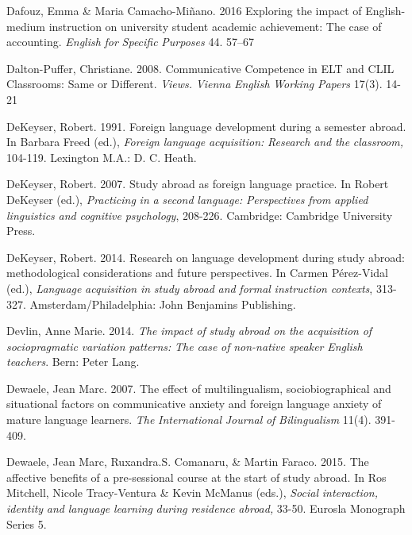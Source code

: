Dafouz, Emma \& Maria Camacho-Miñano. 2016 Exploring the impact of English-medium instruction on university student academic achievement: The case of accounting. \textit{English} \textit{for} \textit{Specific} \textit{Purposes} 44. 57–67

Dalton-Puffer, Christiane. 2008. Communicative Competence in ELT and CLIL Classrooms: Same or Different. \textit{Views.} \textit{Vienna} \textit{English} \textit{Working} \textit{Papers} 17(3). 14-21

DeKeyser, Robert. 1991. Foreign language development during a semester abroad. In Barbara Freed (ed.), \textit{Foreign} \textit{language} \textit{acquisition:} \textit{Research} \textit{and} \textit{the} \textit{classroom,} 104-119. Lexington M.A.: D. C. Heath.

DeKeyser, Robert. 2007. Study abroad as foreign language practice. In Robert DeKeyser (ed.), \textit{Practicing} \textit{in} \textit{a} \textit{second} \textit{language:} \textit{Perspectives} \textit{from} \textit{applied} \textit{linguistics} \textit{and} \textit{cognitive} \textit{psychology}, 208-226. Cambridge: Cambridge University Press.

DeKeyser, Robert. 2014. Research on language development during study abroad: methodological considerations and future perspectives. In Carmen Pérez-Vidal (ed.), \textit{Language} \textit{acquisition} \textit{in} \textit{study} \textit{abroad} \textit{and} \textit{formal} \textit{instruction} \textit{contexts}, 313-327. Amsterdam/Philadelphia: John Benjamins Publishing.

Devlin, Anne Marie. 2014. \textit{The} \textit{impact} \textit{of} \textit{study} \textit{abroad} \textit{on} \textit{the} \textit{acquisition} \textit{of} \textit{sociopragmatic} \textit{variation} \textit{patterns:} \textit{The} \textit{case} \textit{of} \textit{non-native} \textit{speaker} \textit{English} \textit{teachers}. Bern: Peter Lang. 

Dewaele, Jean Marc. 2007. The effect of multilingualism, sociobiographical and situational factors on communicative anxiety and foreign language anxiety of mature language learners. \textit{The} \textit{International} \textit{Journal} \textit{of} \textit{Bilingualism} 11(4). 391-409.

Dewaele, Jean Marc, Ruxandra.S. Comanaru, \& Martin Faraco. 2015. The affective benefits of a pre-sessional course at the start of study abroad. In Ros Mitchell, Nicole Tracy-Ventura \& Kevin McManus (eds.), \textit{Social} \textit{interaction,} \textit{identity} \textit{and} \textit{language} \textit{learning} \textit{during} \textit{residence} \textit{abroad,} 33-50. Eurosla Monograph Series 5.


